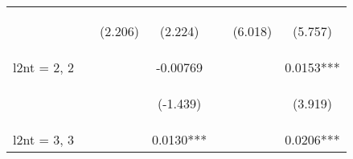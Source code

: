 \documentclass[]{article}
\begin{document}
\begin{center}
\begin{tabular}{lcccccc}
        \vspace{4pt}     & \begin{footnotesize}\end{footnotesize}         & \begin{footnotesize}(2.206)\end{footnotesize}  & \begin{footnotesize}(2.224)\end{footnotesize}  & \begin{footnotesize}\end{footnotesize}          & \begin{footnotesize}(6.018)\end{footnotesize}  & \begin{footnotesize}(5.757)\end{footnotesize}  \\
        l2nt = 2, 2      &                                                &                                                & -0.00769                                       &                                                 &                                                & 0.0153***                                      \\
        \vspace{4pt}     & \begin{footnotesize}\end{footnotesize}         & \begin{footnotesize}\end{footnotesize}         & \begin{footnotesize}(-1.439)\end{footnotesize} & \begin{footnotesize}\end{footnotesize}          & \begin{footnotesize}\end{footnotesize}         & \begin{footnotesize}(3.919)\end{footnotesize}  \\
        l2nt = 3, 3      &                                                &                                                & 0.0130***                                      &                                                 &                                                & 0.0206***                                      \\

\end{tabular}
\end{center}
\end{document}
